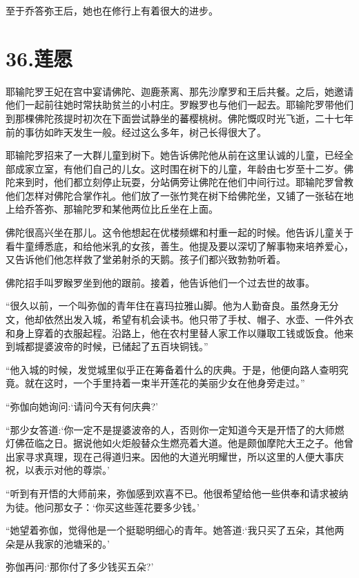 \documentclass[12pt,twoside,openany]{book}
\begin{document}
至于乔答弥王后，她也在修行上有着很大的进步。


\chapter{36.莲愿}\label{ch36}

耶输陀罗王妃在宫中宴请佛陀、迦鹿荼离、那先沙摩罗和王后共餐。之后，她邀请他们一起前往她时常扶助贫兰的小村庄。罗睺罗也与他们一起去。耶输陀罗带他们到那棵佛陀孩提时初次在下面尝试静坐的蕃樱桃树。佛陀慨叹时光飞逝，二十七年前的事彷如昨天发生一般。经过这么多年，树己长得很大了。

耶输陀罗招来了一大群儿童到树下。她告诉佛陀他从前在这里认诚的儿童，已经全部成家立室，有他们自己的儿女。这时围在树下的儿童，年龄由七岁至十二岁。佛陀来到时，他们都立刻停止玩耍，分站俩旁让佛陀在他们中间行过。耶输陀罗曾教他们怎样对佛陀合掌作礼。他们放了一张竹凳在树下给佛陀坐，又铺了一张毡在地上给乔答弥、那输陀罗和某他两位比丘坐在上面。

佛陀很高兴坐在那儿。这令他想起在优楼频螺和村重一起的时候。他告诉儿童关于看牛童缚悉底，和给他米乳的女孩，善生。他提及要以深切了解事物来培养爱心，又告诉他们他怎样救了堂弟射杀的天鹅。孩子们都兴致勃勃听着。

佛陀招手叫罗睺罗坐到他的跟前。接着，他告诉他们一个过去世的故事。

“很久以前，一个叫弥伽的青年住在喜玛拉雅山脚。他为人勤奋良。虽然身无分文，他却依然出发入城，希望有机会读书。他只带了手杖、帽子、水壶、一件外衣和身上穿着的衣服起程。沿路上，他在农村里替人家工作以赚取工钱或饭食。他来到城都提婆波帝的时候，已储起了五百块铜钱。”

“他入城的时候，发觉城里似乎正在筹备着什么的庆典。于是，他便向路人查明究竟。就在这时，一个手里持着一束半开莲花的美丽少女在他身旁走过。”

“弥伽向她询问:‘请问今天有何庆典?’

“那少女答道:‘你一定不是提婆波帝的人，否则你一定知道今天是开悟了的大师燃灯佛莅临之日。据说他如火炬般替众生燃亮着大道。他是颇伽摩陀大王之子。他曾出家寻求真理，现在己得道归来。因他的大道光明耀世，所以这里的人便大事庆祝，以表示对他的尊崇。’

“听到有开悟的大师前来，弥伽感到欢喜不已。他很希望给他一些供奉和请求被纳为徒。他问那女子：‘你买这些莲花要多少钱。’

“她望着弥伽，觉得他是一个挺聪明细心的青年。她答道:‘我只买了五朵，其他两朵是从我家的池塘采的。’

弥伽再问:‘那你付了多少钱买五朵?’
\end{document}
